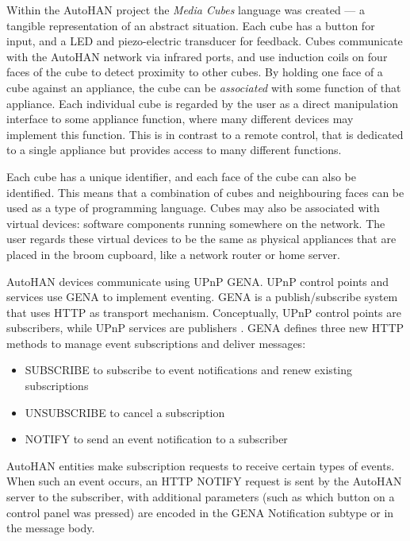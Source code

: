 Within the AutoHAN project the \emph{Media Cubes} language was created --- a tangible representation of an abstract situation. Each cube has a button for input, and a LED and piezo-electric transducer for feedback. Cubes communicate with the AutoHAN network via infrared ports, and use induction coils on four faces of the cube to detect proximity to other cubes. By holding one face of a cube against an appliance, the cube can be \emph{associated} with some function of that appliance. Each individual cube is regarded by the user as a direct manipulation interface to some appliance function, where many different devices may implement this function. This is in contrast to a remote control, that is dedicated to a single appliance but provides access to many different functions. 

Each cube has a unique identifier, and each face of the cube can also be identified. This means that a combination of cubes and neighbouring faces can be used as a type of programming language. Cubes may also be associated with virtual devices: software components running somewhere on the network. The user regards these virtual devices to be the same as physical appliances that are placed in the broom cupboard, like a network router or home server.

AutoHAN devices communicate using \ac{UPnP} \ac{GENA}. \ac{UPnP} control points and services use \ac{GENA} to implement eventing. \ac{GENA} is a publish/subscribe system that uses HTTP as transport mechanism. Conceptually, \ac{UPnP} control points are subscribers, while \ac{UPnP} services are publishers \cite{Jeronimo2009}. \ac{GENA} defines three new HTTP methods to manage event subscriptions and deliver messages:

\begin{itemize}
	\item SUBSCRIBE to subscribe to event notifications and renew existing subscriptions
	\item UNSUBSCRIBE to cancel a subscription
	\item NOTIFY to send an event notification to a subscriber
\end{itemize}

AutoHAN entities make subscription requests to receive certain types of events. When such an event occurs, an HTTP NOTIFY request is sent by the AutoHAN server to the subscriber, with additional parameters (such as which button on a control panel was pressed) are encoded in the \ac{GENA} Notification subtype or in the message body.

